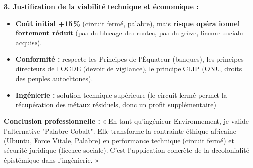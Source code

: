\documentclass[11pt]{article}
\newcommand{\cle}[1]{{\popxbold\color{popdark}#1}}
\begin{document}
\begin{exoresolu}
\textbf{3. Justification de la viabilité technique et économique :}
\begin{itemize}
    \item \textbf{Coût initial +15\,\%} (circuit fermé, palabre), mais \textbf{risque opérationnel fortement réduit} (pas de blocage des routes, pas de grève, licence sociale acquise).
    \item \textbf{Conformité :} respecte les \cle{Principes de l'Équateur} (banques), les principes directeurs de l'\cle{OCDE} (devoir de vigilance), le principe \cle{CLIP} (ONU, droits des peuples autochtones).
    \item \textbf{Ingénierie :} solution technique \cle{supérieure} (le circuit fermé permet la récupération des métaux résiduels, donc un profit supplémentaire).
\end{itemize}

\textbf{Conclusion professionnelle :} « En tant qu'ingénieur Environnement, je valide l'alternative "Palabre-Cobalt". Elle transforme la contrainte éthique africaine (Ubuntu, Force Vitale, Palabre) en \cle{performance technique} (circuit fermé) et \cle{sécurité juridique} (licence sociale). C'est l'application concrète de la \cle{décolonialité épistémique} dans l'ingénierie. »
\end{exoresolu}
\end{document}
